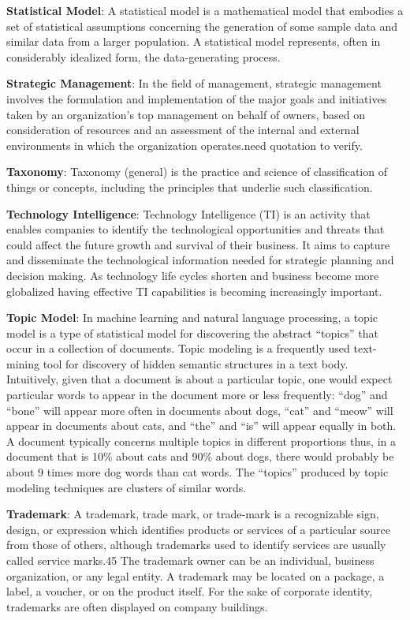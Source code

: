\documentclass[b5paper,]{book}
\theoremstyle{definition}
\theoremstyle{definition}
\theoremstyle{definition}
\theoremstyle{remark}
\begin{document}
\textbf{Statistical Model}: A statistical model is a mathematical model
that embodies a set of statistical assumptions concerning the generation
of some sample data and similar data from a larger population. A
statistical model represents, often in considerably idealized form, the
data-generating process.

\textbf{Strategic Management}: In the field of management, strategic
management involves the formulation and implementation of the major
goals and initiatives taken by an organization's top management on
behalf of owners, based on consideration of resources and an assessment
of the internal and external environments in which the organization
operates.need quotation to verify.

\textbf{Taxonomy}: Taxonomy (general) is the practice and science of
classification of things or concepts, including the principles that
underlie such classification.

\textbf{Technology Intelligence}: Technology Intelligence (TI) is an
activity that enables companies to identify the technological
opportunities and threats that could affect the future growth and
survival of their business. It aims to capture and disseminate the
technological information needed for strategic planning and decision
making. As technology life cycles shorten and business become more
globalized having effective TI capabilities is becoming increasingly
important.

\textbf{Topic Model}: In machine learning and natural language
processing, a topic model is a type of statistical model for discovering
the abstract ``topics'' that occur in a collection of documents. Topic
modeling is a frequently used text-mining tool for discovery of hidden
semantic structures in a text body. Intuitively, given that a document
is about a particular topic, one would expect particular words to appear
in the document more or less frequently: ``dog'' and ``bone'' will
appear more often in documents about dogs, ``cat'' and ``meow'' will
appear in documents about cats, and ``the'' and ``is'' will appear
equally in both. A document typically concerns multiple topics in
different proportions thus, in a document that is 10\% about cats and
90\% about dogs, there would probably be about 9 times more dog words
than cat words. The ``topics'' produced by topic modeling techniques are
clusters of similar words.

\textbf{Trademark}: A trademark, trade mark, or trade-mark is a
recognizable sign, design, or expression which identifies products or
services of a particular source from those of others, although
trademarks used to identify services are usually called service marks.45
The trademark owner can be an individual, business organization, or any
legal entity. A trademark may be located on a package, a label, a
voucher, or on the product itself. For the sake of corporate identity,
trademarks are often displayed on company buildings.
\end{document}
